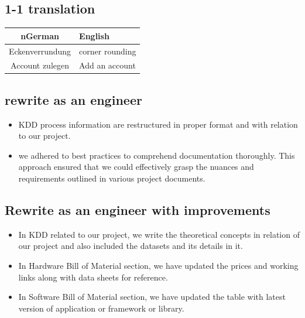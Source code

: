 		\subsection{1-1 translation}
		
			\begin{center}
			
			\begin{tabular}{|c|p{10cm}|} %
				\hline
				\textbf{n}German & \textbf{English} \\
				\hline
				Eckenverrundung & corner rounding \\
				\hline
				Account zulegen & Add an account \\
				\hline
			
			\end{tabular}
		\end{center}
\subsection{rewrite as an engineer}
\begin{itemize}	
	\item KDD process information are restructured in proper format and with
	relation to our project.
		\item we adhered to best practices to comprehend documentation thoroughly. This approach ensured that we could effectively grasp the nuances and requirements outlined in various project documents.
	\end{itemize}
	\subsection{Rewrite as an engineer with improvements}
	\begin{itemize}	
	\item In KDD related to our project, we write the theoretical concepts in
	relation of our project and also included the datasets and its details
	in it.
	 \item In Hardware Bill of Material section, we have updated the prices
	and working links along with data sheets for reference.
	 \item In Software Bill of Material section, we have updated the table with
	latest version of application or framework or library.
\end{itemize}